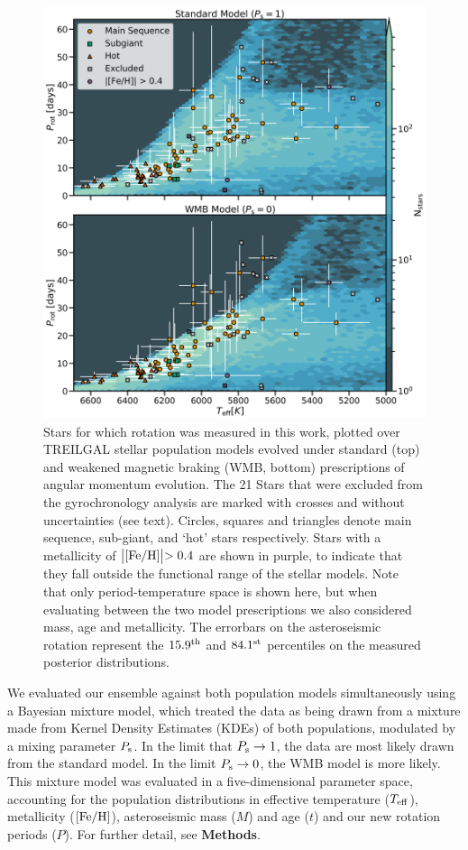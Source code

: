 \documentclass[12pt]{article}
\newcommand{\feh}{\mbox{$\rm{[Fe/H]}$}\xspace}
\begin{document}
\begin{figure}
	\centering
	\includegraphics[width=\textwidth]{fullsample.png}
	\caption{Stars for which rotation was measured in this work, plotted over TREILGAL \cite{girardi+2012} stellar population models evolved under standard (top) and weakened magnetic braking (WMB, bottom) prescriptions of angular momentum evolution. The 21 Stars that were excluded from the gyrochronology analysis are marked with crosses and without uncertainties (see text). Circles, squares and triangles denote main sequence, sub-giant, and `hot' stars respectively. Stars with a metallicity of $\bigl\lvert \feh \bigl\rvert > 0.4$ are shown in purple, to indicate that they fall outside the functional range of the \cite{vansaders+2019} stellar models. Note that only period-temperature space is shown here, but when evaluating between the two model prescriptions we also considered mass, age and metallicity. The errorbars on the asteroseismic rotation represent the $15.9^{\rm th}$ and $84.1^{\rm st}$ percentiles on the measured posterior distributions.}
	\label{fig:fullsample}
\end{figure}

We evaluated our ensemble against both population models simultaneously using a Bayesian mixture model, which treated the data as being drawn from a mixture made from Kernel Density Estimates (KDEs) of both populations, modulated by a mixing parameter $P_{\rm s}$. In the limit that $P_{\rm s} \rightarrow 1$, the data are most likely drawn from the standard model. In the limit $P_{\rm s} \rightarrow 0$, the WMB model is more likely. This mixture model was evaluated in a five-dimensional parameter space, accounting for the population distributions in effective temperature ($T_{\rm eff}$), metallicity (\feh), asteroseismic mass ($M$) and age ($t$) and our new rotation periods ($P$). For further detail, see \textbf{Methods}.\\
\end{document}
